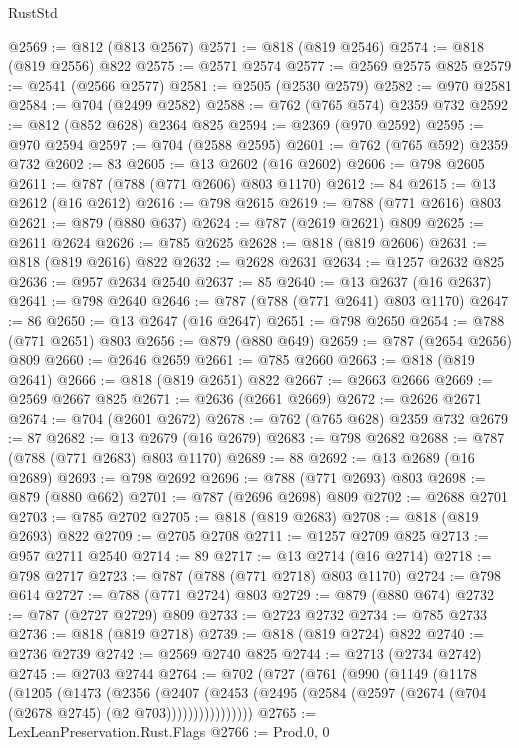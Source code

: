 \begin{lexlean}{RustStd}
\begin{coremodule}
@2569 := @812 (@813 @2567)
@2571 := @818 (@819 @2546)
@2574 := @818 (@819 @2556) @822
@2575 := @2571 @2574
@2577 := @2569 @2575 @825
@2579 := @2541 (@2566 @2577)
@2581 := @2505 (@2530 @2579)
@2582 := @970 @2581
@2584 := @704 (@2499 @2582)
@2588 := @762 (@765 @574) @2359 @732
@2592 := @812 (@852 @628) @2364 @825
@2594 := @2369 (@970 @2592)
@2595 := @970 @2594
@2597 := @704 (@2588 @2595)
@2601 := @762 (@765 @592) @2359 @732
@2602 := 83
@2605 := @13 @2602 (@16 @2602)
@2606 := @798 @2605
@2611 := @787 (@788 (@771 @2606) @803 @1170)
@2612 := 84
@2615 := @13 @2612 (@16 @2612)
@2616 := @798 @2615
@2619 := @788 (@771 @2616) @803
@2621 := @879 (@880 @637)
@2624 := @787 (@2619 @2621) @809
@2625 := @2611 @2624
@2626 := @785 @2625
@2628 := @818 (@819 @2606)
@2631 := @818 (@819 @2616) @822
@2632 := @2628 @2631
@2634 := @1257 @2632 @825
@2636 := @957 @2634 @2540
@2637 := 85
@2640 := @13 @2637 (@16 @2637)
@2641 := @798 @2640
@2646 := @787 (@788 (@771 @2641) @803 @1170)
@2647 := 86
@2650 := @13 @2647 (@16 @2647)
@2651 := @798 @2650
@2654 := @788 (@771 @2651) @803
@2656 := @879 (@880 @649)
@2659 := @787 (@2654 @2656) @809
@2660 := @2646 @2659
@2661 := @785 @2660
@2663 := @818 (@819 @2641)
@2666 := @818 (@819 @2651) @822
@2667 := @2663 @2666
@2669 := @2569 @2667 @825
@2671 := @2636 (@2661 @2669)
@2672 := @2626 @2671
@2674 := @704 (@2601 @2672)
@2678 := @762 (@765 @628) @2359 @732
@2679 := 87
@2682 := @13 @2679 (@16 @2679)
@2683 := @798 @2682
@2688 := @787 (@788 (@771 @2683) @803 @1170)
@2689 := 88
@2692 := @13 @2689 (@16 @2689)
@2693 := @798 @2692
@2696 := @788 (@771 @2693) @803
@2698 := @879 (@880 @662)
@2701 := @787 (@2696 @2698) @809
@2702 := @2688 @2701
@2703 := @785 @2702
@2705 := @818 (@819 @2683)
@2708 := @818 (@819 @2693) @822
@2709 := @2705 @2708
@2711 := @1257 @2709 @825
@2713 := @957 @2711 @2540
@2714 := 89
@2717 := @13 @2714 (@16 @2714)
@2718 := @798 @2717
@2723 := @787 (@788 (@771 @2718) @803 @1170)
@2724 := @798 @614
@2727 := @788 (@771 @2724) @803
@2729 := @879 (@880 @674)
@2732 := @787 (@2727 @2729) @809
@2733 := @2723 @2732
@2734 := @785 @2733
@2736 := @818 (@819 @2718)
@2739 := @818 (@819 @2724) @822
@2740 := @2736 @2739
@2742 := @2569 @2740 @825
@2744 := @2713 (@2734 @2742)
@2745 := @2703 @2744
@2764 := @702
    (@727
      (@761
        (@990
          (@1149
            (@1178
              (@1205
                (@1473
                  (@2356
                    (@2407
                      (@2453
                        (@2495 (@2584 (@2597 (@2674 (@704 (@2678 @2745) (@2 @703))))))))))))))))
@2765 := LexLeanPreservation.Rust.Flags
@2766 := Prod.{0, 0}

\end{coremodule}
\end{lexlean}
